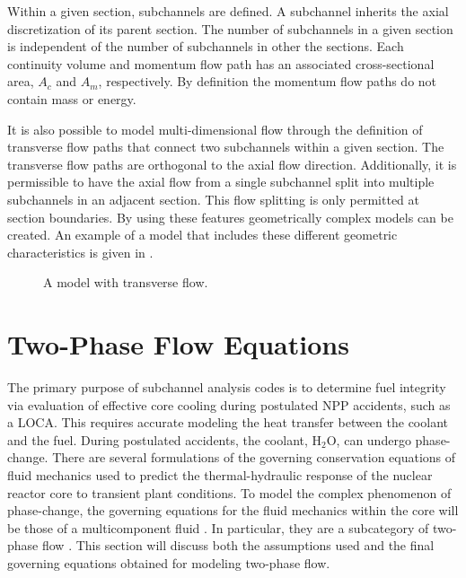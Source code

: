 Within a given section, subchannels are defined.
A subchannel inherits the axial discretization of its parent section.
The number of subchannels in a given section is independent of the number of subchannels in other the sections.
Each continuity volume and momentum flow path has an associated cross-sectional area, $A_{c}$ and $A_{m}$, respectively. 
By definition the momentum flow paths do not contain mass or energy.

It is also possible to model multi-dimensional flow through the definition of transverse flow paths that connect two subchannels within a given section.
The transverse flow paths are orthogonal to the axial flow direction.
Additionally, it is permissible to have the axial flow from a single subchannel split into multiple subchannels in an adjacent section.
This flow splitting is only permitted at section boundaries.
By using these features geometrically complex models can be created.
An example of a model that includes these different geometric characteristics is given in .

\begin{figure}[ht!]
\centering

\caption{A model with transverse flow.}
\label{fig:complex_geometry}
\end{figure}

\section{Two-Phase Flow Equations}
\label{sect:two_phase_flow}
The primary purpose of subchannel analysis codes is to determine fuel integrity via evaluation of effective core cooling during postulated NPP accidents, such as a LOCA.
This requires accurate modeling the heat transfer between the coolant and the fuel. 
During postulated accidents, the coolant, H$_2$O, can undergo phase-change.
There are several formulations of the governing conservation equations of fluid mechanics used to predict the thermal-hydraulic response of the nuclear reactor core to transient plant conditions.
To model the complex phenomenon of phase-change, the governing equations for the fluid mechanics within the core will be those of a multicomponent fluid \cite{Drew1998}.
In particular, they are a subcategory of two-phase flow \cite{Todreas2011, Stewart1984, Ishii1984}.
This section will discuss both the assumptions used and the final governing equations obtained for modeling two-phase flow.

